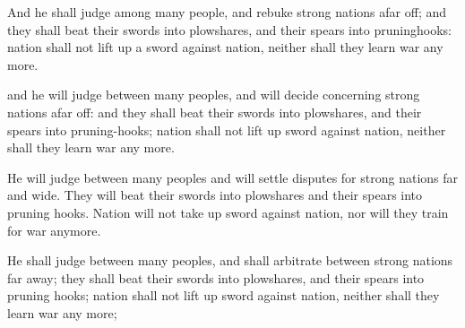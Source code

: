 			And he shall judge among many people, and rebuke strong nations afar off; and they shall beat their swords into plowshares, and their spears into pruninghooks: nation shall not lift up a sword against nation, neither shall they learn war any more.

			\begin{versebox}
					\item[BHS] 
					\item[LXX] 
					\item[ASV] and he will judge between many peoples, and will decide concerning strong nations afar off: and they shall beat their swords into plowshares, and their spears into pruning-hooks; nation shall not lift up sword against nation, neither shall they learn war any more.
					\item[NIV] He will judge between many peoples and will settle disputes for strong nations far and wide. They will beat their swords into plowshares and their spears into pruning hooks. Nation will not take up sword against nation, nor will they train for war anymore.
					\item[NRSV] He shall judge between many peoples, and shall arbitrate between strong nations far away; they shall beat their swords into plowshares, and their spears into pruning hooks; nation shall not lift up sword against nation, neither shall they learn war any more;
			\end{versebox}

